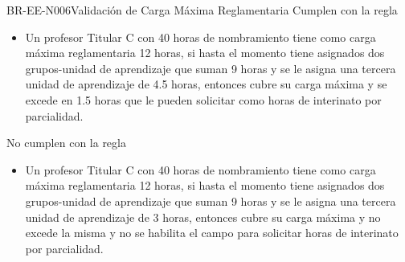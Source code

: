 \begin{BusinessRule}{BR-EE-N006}{Validación de Carga Máxima Reglamentaria}
		 Cumplen con la regla
		\begin{itemize}
			\item Un profesor Titular C con 40 horas de nombramiento tiene como carga máxima reglamentaria 12 horas, si hasta el momento tiene asignados dos grupos-unidad de aprendizaje que suman 9 horas y se le asigna una tercera unidad de aprendizaje de 4.5 horas, entonces cubre su carga máxima y se excede en 1.5 horas que le pueden solicitar como horas de interinato por parcialidad.
		\end{itemize}
		 No cumplen con la regla
		\begin{itemize}
			\item Un profesor Titular C con 40 horas de nombramiento tiene como carga máxima reglamentaria 12 horas, si hasta el momento tiene asignados dos grupos-unidad de aprendizaje que suman 9 horas y se le asigna una tercera unidad de aprendizaje de 3 horas, entonces cubre su carga máxima y no excede la misma y no se habilita el campo para solicitar horas de interinato por parcialidad. 
		\end{itemize}
\end{BusinessRule}

